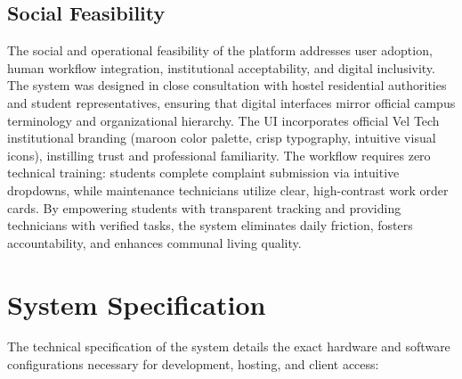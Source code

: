 \documentclass[10pt]{report}
\begin{document}
\subsection{Social Feasibility}
\hspace{0.5cm}The social and operational feasibility of the platform addresses user adoption, human workflow integration, institutional acceptability, and digital inclusivity. The system was designed in close consultation with hostel residential authorities and student representatives, ensuring that digital interfaces mirror official campus terminology and organizational hierarchy. The UI incorporates official Vel Tech institutional branding (maroon color palette, crisp typography, intuitive visual icons), instilling trust and professional familiarity. The workflow requires zero technical training: students complete complaint submission via intuitive dropdowns, while maintenance technicians utilize clear, high-contrast work order cards. By empowering students with transparent tracking and providing technicians with verified tasks, the system eliminates daily friction, fosters accountability, and enhances communal living quality.

\section{System Specification}
\hspace{0.5cm}The technical specification of the system details the exact hardware and software configurations necessary for development, hosting, and client access:
\end{document}
